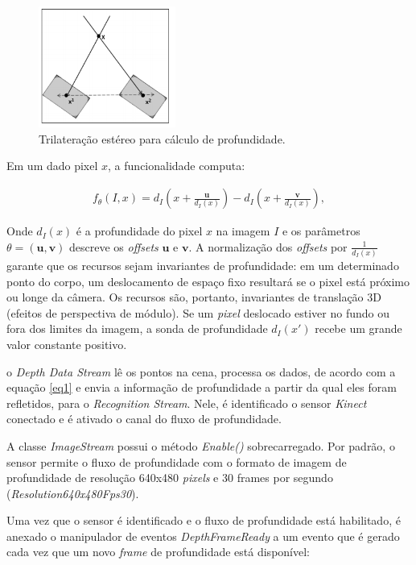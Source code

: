 \begin{figure}[!h]
\centering
\includegraphics[width=0.4\textwidth]{images/trilateracao_estereo.png}
\caption{Trilateração estéreo para cálculo de profundidade.}
\label{fig:trilatStereo}
\end{figure}

Em um dado pixel $x$, a funcionalidade computa: 


\begin{align}
{f_{\theta}}(I, x) = d_{I}  \left(x + \frac{\boldsymbol{u}}{d_{I}(x)}\right) -  d_{I} \left(x + \frac{\boldsymbol{v}}{d_{I}(x)}\right) ,
\label{eq:eq1}
\end{align}

Onde $d_{I}(x)$ é a profundidade do pixel $x$ na imagem $I$ e os parâmetros $\theta = (\boldsymbol{u,v})$ descreve os \textit{offsets} $\boldsymbol{u}$ e $\boldsymbol{v}$. A normalização dos \textit{offsets} por $\frac{1}{d_{I}(x)}$ garante que os recursos sejam invariantes de profundidade: em um determinado ponto do corpo, um deslocamento de espaço fixo resultará se o pixel está próximo ou longe da câmera. Os recursos são, portanto, invariantes de translação 3D (efeitos de perspectiva de módulo). Se um \textit{pixel} deslocado estiver no fundo ou fora dos limites da imagem, a sonda de profundidade $d_{I}(x')$ recebe um grande valor constante positivo.

o \textit{Depth Data Stream} lê os pontos na cena, processa os dados, de acordo com a equação \ref{eq1} e envia a informação de profundidade a partir da qual eles foram refletidos, para o \textit{Recognition Stream}. Nele, é identificado o sensor \textit{Kinect} conectado e é ativado o canal do fluxo de profundidade.

A classe \textit{ImageStream} possui o método \textit{Enable()} sobrecarregado. Por padrão, o sensor permite o fluxo de profundidade com o formato de imagem de profundidade de resolução 640x480 \textit{pixels} e 30 frames por segundo (\textit{Resolution640x480Fps30}).

Uma vez que o sensor é identificado e o fluxo de profundidade está habilitado, é anexado o manipulador de eventos \textit{DepthFrameReady} a um evento que é gerado cada vez que um novo \textit{frame} de profundidade está disponível:


